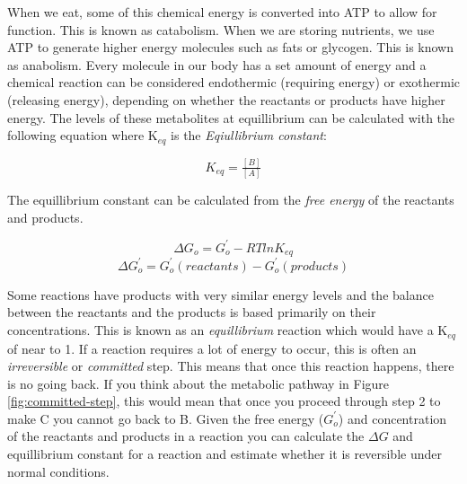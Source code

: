 \documentclass{tufte-handout}
\begin{document}
  When we eat, some of this chemical energy is converted into ATP to allow for function.  This is known as catabolism.  When we are storing nutrients, we use ATP to generate higher energy molecules such as fats or glycogen.  This is known as anabolism.  Every molecule in our body has a set amount of energy and a chemical reaction can be considered endothermic (requiring energy) or exothermic (releasing energy), depending on whether the reactants or products have higher energy.  The levels of these metabolites at equillibrium can be calculated with the following equation where K$_{eq}$ is the \emph{Eqiullibrium constant}:

\begin{equation}
K_{eq}=\tfrac{[B]}{[A]}
\end{equation}

 The equillibrium constant can be calculated from the \emph{free energy} of the reactants and products.

\begin{equation}
\Delta G_{o} = G^{'}_{o} - R T ln K_{eq}
\end{equation}
\begin{equation}
\Delta G^{'}_{o} = G^{'}_{o} (reactants) - G^{'}_{o} (products) 
 \end{equation}


Some reactions have products with very similar energy levels and the balance between the reactants and the products is based primarily on their concentrations.  This is known as an \emph{equillibrium} reaction which would have a K$_{eq}$ of near to 1.  If a reaction requires a lot of energy to occur, this is often an \emph{irreversible} or \emph{committed} step.  This means that once this reaction happens, there is no going back.  If you think about the metabolic pathway in Figure \ref{fig:committed-step}, this would mean that once you proceed through step 2 to make  C you cannot go back to B.  Given the free energy ($G^{'}_{o}$) and concentration of the reactants and products in a reaction you can calculate the $\Delta G$ and equillibrium constant for a reaction and estimate whether it is reversible under normal conditions.
\end{document}
